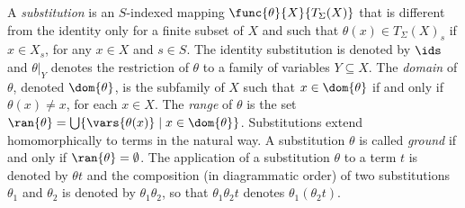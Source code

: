 A {\em substitution} is an $S$-indexed mapping
$\func{\theta}{X}{T_\Sigma(X)}$ that is different from the identity
only for a finite subset of $X$ and such that $\theta(x) \in
T_\Sigma(X)_s$ if $x \in X_s$, for any $x \in X$ and $s\in S$.  The
identity substitution is denoted by $\ids$ and $\theta|_Y$ denotes the
restriction of $\theta$ to a family of variables $Y\subseteq X$.  The
\emph{domain} of $\theta$, denoted $\dom{\theta}$, is the subfamily of
$X$ such that $x \in \dom{\theta}$ if and only if $\theta(x)\neq x$,
for each $x \in X$.  The \emph{range} of $\theta$ is the set
$\ran{\theta} = \bigcup \{ \vars{\theta(x)} \mid x \in
\dom{\theta}\}$. Substitutions extend homomorphically to terms in the
natural way.  A substitution $\theta$ is called {\em ground} if and
only if $\ran{\theta} = \emptyset$.  The application of a substitution
$\theta$ to a term $t$ is denoted by $\theta t$ and the composition
(in diagrammatic order) of two substitutions $\theta_1$ and $\theta_2$
is denoted by $\theta_1\theta_2$, so that $ \theta_1\theta_2 t$
denotes $\theta_1(\theta_2 t)$.

